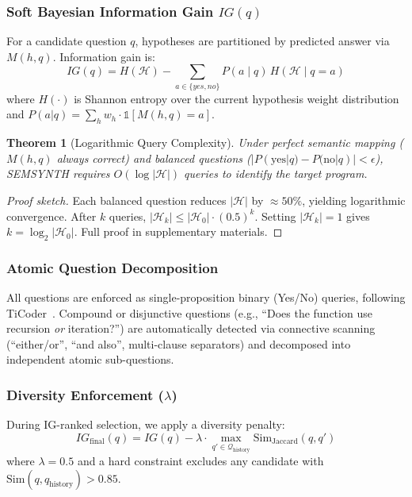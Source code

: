 \documentclass[10pt,conference]{IEEEtran}
\newtheorem{theorem}{Theorem}
\begin{document}
\subsubsection{Soft Bayesian Information Gain $IG(q)$}
For a candidate question $q$, hypotheses are partitioned by predicted answer via $M(h,q)$. Information gain is:
\begin{equation}\label{eq:ig}
IG(q) = H(\mathcal{H}) - \sum_{a \in \{yes,no\}} P(a\mid q)\,H(\mathcal{H}\mid q=a)
\end{equation}
where $H(\cdot)$ is Shannon entropy over the current hypothesis weight distribution and $P(a|q) = \sum_{h} w_h \cdot \mathbb{1}[M(h,q) = a]$.

\begin{theorem}[Logarithmic Query Complexity]
Under perfect semantic mapping ($M(h, q)$ always correct) and balanced questions ($|P(\text{yes}|q) - P(\text{no}|q)| < \epsilon$), SEMSYNTH requires $O(\log |\mathcal{H}|)$ queries to identify the target program.
\end{theorem}
\begin{proof}[Proof sketch]
Each balanced question reduces $|\mathcal{H}|$ by $\approx 50\%$, yielding logarithmic convergence. After $k$ queries, $|\mathcal{H}_k| \leq |\mathcal{H}_0| \cdot (0.5)^k$. Setting $|\mathcal{H}_k| = 1$ gives $k = \log_2 |\mathcal{H}_0|$. Full proof in supplementary materials.
\end{proof}

\subsubsection{Atomic Question Decomposition}
All questions are enforced as single-proposition binary (Yes/No) queries, following TiCoder~\cite{ticoder}. Compound or disjunctive questions (e.g., ``Does the function use recursion \textit{or} iteration?'') are automatically detected via connective scanning (``either/or'', ``and also'', multi-clause separators) and decomposed into independent atomic sub-questions.

\subsubsection{Diversity Enforcement ($\lambda$)}
During IG-ranked selection, we apply a diversity penalty:
\begin{equation}\label{eq:diversity}
IG_{\text{final}}(q) = IG(q) - \lambda \cdot \max_{q' \in \mathcal{Q}_{\text{history}}} \text{Sim}_{\text{Jaccard}}(q, q')
\end{equation}
where $\lambda = 0.5$ and a hard constraint excludes any candidate with $\text{Sim}(q, q_{\text{history}}) > 0.85$.
\end{document}
